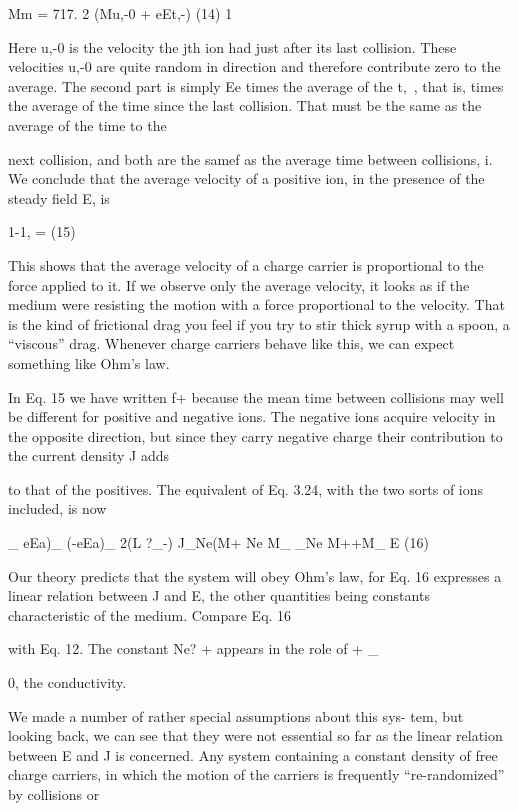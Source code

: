 Mm = 717. 2 (Mu,-0 + eEt,-) (14)
1
\begin{equation}
\end{equation}

Here u,-0 is the velocity the jth ion had just after its last collision.
These velocities u,-0 are quite random in direction and therefore contribute
zero to the average. The second part is simply Ee times the
average of the t,~, that is, times the average of the time since the last
collision. That must be the same as the average of the time to the

next collision, and both are the samef as the average time between
collisions, i. We conclude that the average velocity of a positive ion,
in the presence of the steady field E, is

1-1, =  (15)
\begin{equation}
\end{equation}

This shows that the average velocity of a charge carrier is proportional
to the force applied to it. If we observe only the average
velocity, it looks as if the medium were resisting the motion with a
force proportional to the velocity. That is the kind of frictional drag
you feel if you try to stir thick syrup with a spoon, a ``viscous'' drag.
Whenever charge carriers behave like this, we can expect something
like Ohm's law.

In Eq. 15 we have written f+ because the mean time between collisions
may well be different for positive and negative ions. The negative
ions acquire velocity in the opposite direction, but since they
carry negative charge their contribution to the current density J adds

to that of the positives. The equivalent of Eq. 3.24, with the two sorts
of ions included, is now

_ eEa)_ (-eEa)_ 2(L ?_-)
J_Ne(M+ Ne M_ _Ne M++M_ E (16)
\begin{equation}
\end{equation}

Our theory predicts that the system will obey Ohm's law, for
Eq. 16 expresses a linear relation between J and E, the other quantities
being constants characteristic of the medium. Compare Eq. 16

with Eq. 12. The constant Ne?  +  appears in the role of
+ _

0, the conductivity.

We made a number of rather special assumptions about this sys-
tem, but looking back, we can see that they were not essential so far
as the linear relation between E and J is concerned. Any system
containing a constant density of free charge carriers, in which the
motion of the carriers is frequently ``re-randomized'' by collisions or

